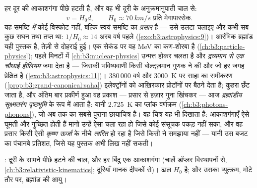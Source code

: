 \begin{definition}[हबल का नियम और तप्त आरंभ]\label{def:b3:astrophysics:hubble}
हर दूर की आकाशगंगा पीछे हटती है, और वह भी दूरी के अनुक्रमानुपाती चाल से:
\[
v = H_0d , \qquad H_0 \approx \qty{70}{km/s}
\text{ प्रति मेगापारसेक} .
\]
यह समष्टि \emph{में} कोई विस्फोट नहीं, बल्कि स्वयं समष्टि का
\emph{प्रसार} है --- उसे उलटा चलाइए और कभी सब कुछ
सघन तथा तप्त था: $1/H_0 \approx 14$ अरब वर्ष पहले
(\cref{exo:b3:astrophysics:9})। आरंभिक ब्रह्मांड यही पुस्तक है,
तेज़ी से दोहराई हुई। एक सेकंड पर वह \unit{MeV} का कण-शोरबा है
(\cref{ch:b3:particle-physics}); पहले मिनटों में
\cref{ch:b3:nuclear-physics} उन्मत्त होकर चलता है और
\emph{द्रव्यमान से एक चौथाई हीलियम} जमा देता है --- जिसकी भविष्यवाणी
किसी बोल्ट्ज़मान गुणक ने की और जो हर जगह प्रेक्षित है
(\cref{exo:b3:astrophysics:11})। 380\,000 वर्ष और
\qty{3000}{K} पर साहा का समीकरण
(\cref{prop:b3:grand-canonical:saha}) इलेक्ट्रॉनों को आख़िरकार
प्रोटॉनों पर बैठने देता है; कुहरा छँट जाता है, और अंतिम बार प्रकीर्ण
हुआ वह प्रकाश --- प्रसार से हज़ार गुना खिंचकर --- आज
\emph{ब्रह्मांडीय सूक्ष्मतरंग पृष्ठभूमि} के रूप में आता है: यानी
\qty{2.725}{K} का प्लांक वर्णक्रम (\cref{ch:b3:photons-phonons}),
जो अब तक का सबसे पुराना छायाचित्र है। वह चित्र यह भी दिखाता है:
आकाशगंगाएँ ऐसे घूमती और गुच्छित होती हैं मानो उन्हें ऐसा
\emph{} चला रहा हो जिसे कोई संसूचक पकड़ नहीं सका, और
वह प्रसार किसी ऐसी \emph{कृष्ण ऊर्जा} के नीचे \emph{त्वरित} हो रहा है
जिसे किसी ने समझाया नहीं --- यानी उस बजट का पंचानबे प्रतिशत,
जिसे यह पुस्तक अभी लिख नहीं सकती।
\end{definition}

\begin{omfigure}

{\small {}: दूरी के सामने पीछे हटने की चाल, और हर बिंदु
एक आकाशगंगा (चालें डॉप्लर विस्थापनों से,
\cref{ch:b3:relativistic-kinematics}; दूरियाँ मानक
दीपकों से)। ढाल $H_0$ है; और उसका व्युत्क्रम, मोटे तौर पर, ब्रह्मांड
की आयु।}
\end{omfigure}

